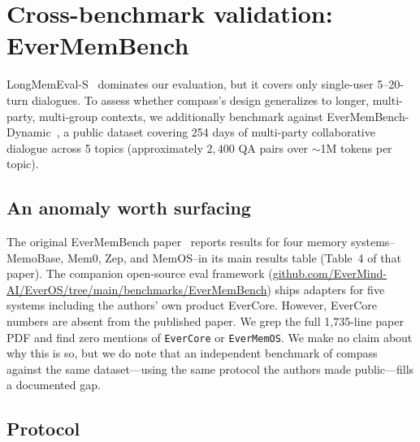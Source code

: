 %
%

\section{Cross-benchmark validation: EverMemBench}
\label{sec:evermembench}

LongMemEval-S~\citep{wu2024longmemeval} dominates our evaluation, but it
covers only single-user 5--20-turn dialogues. To assess whether
compass's design generalizes to longer, multi-party, multi-group
contexts, we additionally benchmark against
EverMemBench-Dynamic~\citep{hu2026evermembench}, a public dataset
covering 254 days of multi-party collaborative dialogue across 5 topics
(approximately \(2{,}400\) QA pairs over \(\sim\)1M tokens per topic).

\subsection{An anomaly worth surfacing}

The original EverMemBench paper~\citep{hu2026evermembench} reports
results for four memory systems--MemoBase, Mem0, Zep, and MemOS--in
its main results table (Table~4 of that paper). The companion
open-source eval framework
(\url{github.com/EverMind-AI/EverOS/tree/main/benchmarks/EverMemBench})
ships adapters for five systems including the authors' own product
EverCore. However, EverCore numbers are absent from the published
paper. We grep the full 1{,}735-line paper PDF and find zero
mentions of \texttt{EverCore} or \texttt{EverMemOS}. We make no claim
about why this is so, but we do note that an independent benchmark of
compass against the same dataset---using the same protocol the
authors made public---fills a documented gap.

\subsection{Protocol}

